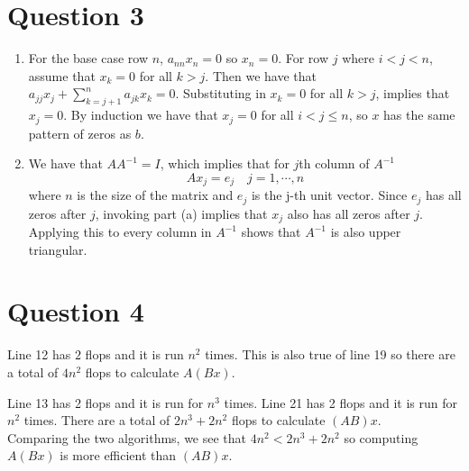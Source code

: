 \documentclass{article}
\begin{document}
\section*{Question 3}
\begin{enumerate}
    \item For the base case row $n$, $a_{nn} x_n = 0$ so $x_n = 0$.
    For row $j$ where $i< j < n$, assume that $x_k = 0$ for all $k > j$.
    Then we have that $a_{jj}x_j + \sum_{k=j+1}^n a_{jk}x_k = 0$.
    Substituting in $x_k = 0$ for all $k > j$, implies that $x_j = 0$.
    By induction we have that $x_j = 0$ for all  $i< j \leq n$,
    so $x$ has the same pattern of zeros as $b$.
    \item We have that $AA^{-1} = I$, 
    which implies that for $j$th column of $A^{-1}$
    \[  
        Ax_j = e_j \quad j=1,\cdots, n
    \]
    where $n$ is the size of the matrix and $e_j$ is the j-th unit vector.
    Since $e_j$ has all zeros after $j$, invoking part (a)
    implies that $x_j$ also has all zeros after $j$.
    Applying this to every column in $A^{-1}$ shows that 
    $A^{-1}$ is also upper triangular.
\end{enumerate}
\newpage

\section*{Question 4}

Line 12 has $2$ flops and it is run $n^2$ times.
This is also true of line 19 so there are a total of 
$4n^2$ flops to calculate $A(Bx)$.
\newpage


Line 13 has 2 flops and it is run for $n^3$ times.
Line 21 has 2 flops and it is run for $n^2$ times.
There are a total of $2n^3 + 2n^2$ flops
to calculate $(AB)x$. \\

Comparing the two algorithms, we see that 
$4n^2 < 2n^3 + 2n^2$ so computing $A(Bx)$ is
more efficient than $(AB)x$.
\end{document}

